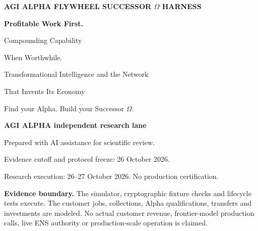 \documentclass[11pt,letterpaper]{article}
\begin{document}
\thispagestyle{empty}
{\small\bfseries\color{gold} AGI ALPHA FLYWHEEL \hfill SUCCESSOR $\Omega$ HARNESS}\par
\vspace{0.25in}
{\fontsize{28}{32}\selectfont\bfseries\color{ink} Profitable Work First.\par Compounding Capability\par When Worthwhile.\par}
\vspace{0.2in}
{\Large Transformational Intelligence and the Network\par That Invents Its Economy\par}
\vspace{0.2in}
{\large Find your Alpha. Build your Successor $\Omega$.}\par
\vspace{0.18in}

\textbf{AGI ALPHA independent research lane}\par
Prepared with AI assistance for scientific review.\par
Evidence cutoff and protocol freeze: 26 October 2026.\par
Research execution: 26--27 October 2026. No production certification.

\vspace{0.2in}
\begin{abstract}
We investigate whether competent frontier intelligence can profitably deliver complete proof-carrying software components at buyer-chosen prices referenced to equivalent human services. A finite-cash simulation separates paid delivery, additional capability retention and optional research. Buyers can choose a human service, wait or decline. The tested graph lifecycle guards scoped admission and network reuse without changing existing settlement authority. We execute 1,728 training histories and 4,560 fresh confirmation histories. Model/API prices and labor sources anchor costs; task capability, human effort, demand and skill effects remain explicit assumptions.
\end{abstract}

\vfill
\colorbox{light}{\parbox{0.95\linewidth}{\small\textbf{Evidence boundary.} The simulator, cryptographic fixture checks and lifecycle tests execute. The customer jobs, collections, Alpha qualifications, transfers and investments are modeled. No actual customer revenue, frontier-model production calls, live ENS authority or production-scale operation is claimed.}}
\newpage
\end{document}
